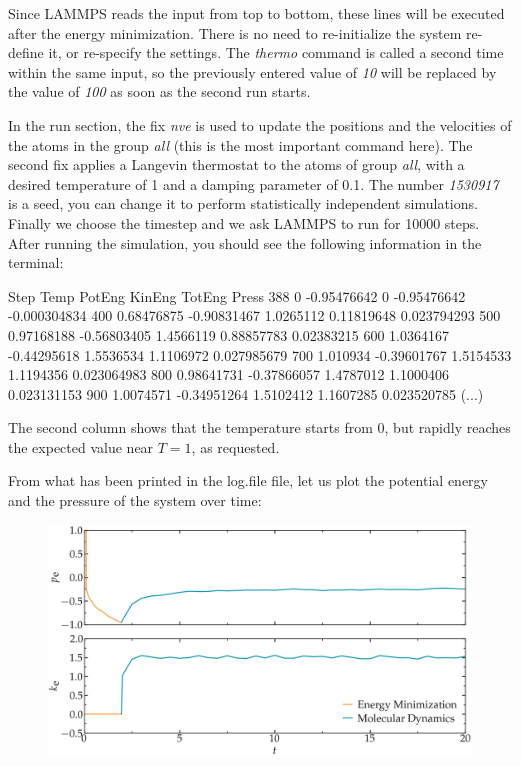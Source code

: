 \noindent Since LAMMPS reads the input from top to
bottom, these lines will be executed after the energy
minimization. There is no need to re-initialize the system
re-define it, or re-specify the settings. The \textit{thermo} command
is called a second time within the same input, so the previously
entered value of \textit{10} will be replaced by the value of \textit{100}
as soon as the second run starts.

In the run section, the fix \textit{nve} is used to update the
positions and the velocities of the atoms in the group
\textit{all} (this is the most important command here). The second
fix applies a Langevin thermostat to the atoms of group
\textit{all}, with a desired temperature of 1 and a damping
parameter of 0.1. The number \textit{1530917} is a seed, you can
change it to perform statistically independent simulations.
Finally we choose the timestep and we ask LAMMPS to
run for 10000 steps. After running the simulation, you
should see the following information in the terminal:

\begin{lcverbatim}
Step   Temp          PotEng         KinEng       TotEng        Press     
388    0             -0.95476642    0           -0.95476642   -0.000304834
400    0.68476875    -0.90831467    1.0265112    0.11819648    0.023794293  
500    0.97168188    -0.56803405    1.4566119    0.88857783    0.02383215   
600    1.0364167     -0.44295618    1.5536534    1.1106972     0.027985679  
700    1.010934      -0.39601767    1.5154533    1.1194356     0.023064983  
800    0.98641731    -0.37866057    1.4787012    1.1000406     0.023131153  
900    1.0074571     -0.34951264    1.5102412    1.1607285     0.023520785 
(...)
\end{lcverbatim}

\noindent The second column shows that the temperature
starts from 0, but rapidly reaches the
expected value near $T=1$, as requested. 

From what has been printed in the log.file file, let us
plot the potential energy and the pressure of
the system over time:

\begin{figure}[h!]
\includegraphics[width=\linewidth]{tutorials/level0/lennard-jones-fluid/energy-light.png}
\end{figure}


